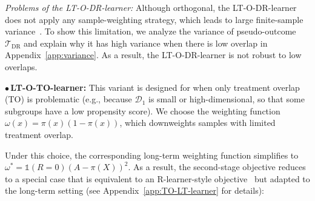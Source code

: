 \documentclass{article}
\theoremstyle{plain}
\theoremstyle{definition}
\newtheorem{definition}[theorem]{Definition}
\theoremstyle{remark}
\newcommand{\E}{\mathbb{E}}                %
\newcommand{\1}{\mathds{1}}                %
\newcommand{\DR}{LT-O-DR-learner\xspace}
\newcommand{\TO}{LT-O-TO-learner\xspace}
\begin{document}
%
%



\emph{Problems of the \DR:} Although orthogonal, the \DR does not apply any sample-weighting strategy, which leads to large finite-sample variance~\cite{Fisher.2023}. To show this limitation, we analyze the variance of pseudo-outcome $ \mathcal{T}_\mathrm{DR}$ and explain why it has high variance when there is low overlap in Appendix~\ref{app:variance}. As a result, the \DR is not robust to low overlaps.



$\bullet$\,\textbf{\TO:} This variant is designed for when only treatment overlap (TO) is problematic (e.g., because $\mathcal{D}_1$ is small or high-dimensional, so that some subgroups have a low propensity score). We choose the weighting function $\omega(x)=\pi(x)(1-\pi(x))$, which downweights samples with limited treatment overlap. 

Under this choice, the corresponding long-term weighting function simplifies to $\omega^*=\1(R=0)(A-\pi(X))^2$. As a result, the second-stage objective reduces to a special case that is equivalent to an R-learner-style objective~\cite{Nie.2021} but adapted to the long-term setting (see Appendix~\ref{app:TO-LT-learner} for details):
\end{document}
